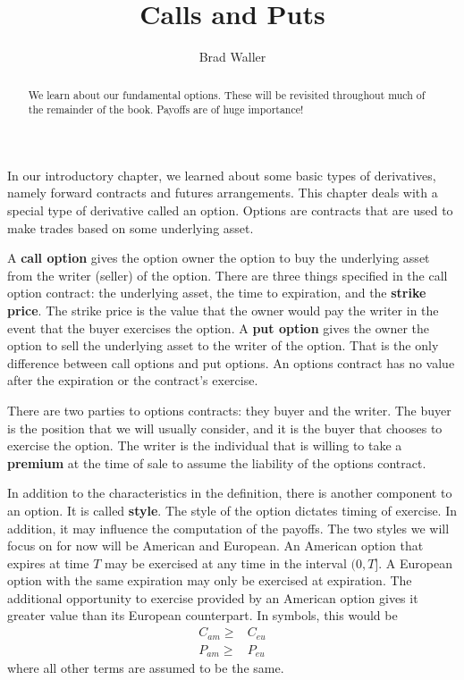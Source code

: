 \documentclass{ximera}
\author{Brad Waller}
\title{Calls and Puts}
\begin{document}
\begin{abstract}
We learn about our fundamental options. These will be revisited throughout much of the remainder of the book. Payoffs are of huge importance!
\end{abstract}

\maketitle

In our introductory chapter, we learned about some basic types of derivatives, namely forward contracts and futures arrangements. This chapter deals with a special type of derivative called an option. Options are contracts that are used to make trades based on some underlying asset.

\begin{definition}
A {\bf call option} gives the option owner the option to buy the underlying asset from the writer (seller) of the option. There are three things specified in the call option contract: the underlying asset, the time to expiration, and the {\bf strike price}. The strike price is the value that the owner would pay the writer in the event that the buyer exercises the option. A {\bf put option} gives the owner the option to sell the underlying asset to the writer of the option. That is the only difference between call options and put options. An options contract has no value after the expiration or the contract's exercise.
\end{definition}

There are two parties to options contracts: they buyer and the writer. The buyer is the position that we will usually consider, and it is the buyer that chooses to exercise the option. The writer is the individual that is willing to take a {\bf premium} at the time of sale to assume the liability of the options contract.

In addition to the characteristics in the definition, there is another component to an option. It is called {\bf style}. The style of the option dictates timing of exercise. In addition, it may influence the computation of the payoffs. The two styles we will focus on for now will be American and European. An American option that expires at time $T$ may be exercised at any time in the interval $(0,T]$. A European option with the same expiration may only be exercised at expiration. The additional opportunity to exercise provided by an American option gives it greater value than its European counterpart. In symbols, this would be
\begin{align*}
C_{am}\geq&C_{eu}\\
P_{am}\geq&P_{eu}
\end{align*}
where all other terms are assumed to be the same. 
\end{document}
